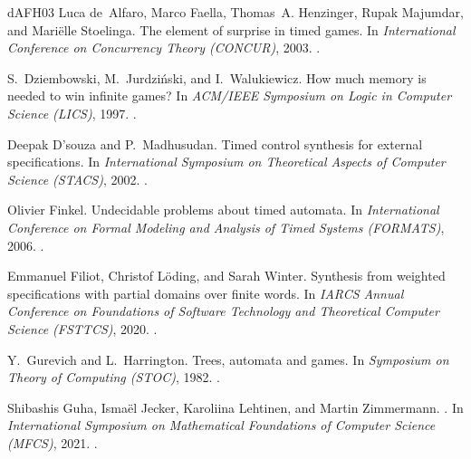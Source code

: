 \documentclass[10pt,a4paper]{amsart}
\theoremstyle{definition}
\numberwithin{equation}{section}
\begin{document}
\begin{thebibliography}{dAFH{\etalchar{+}}03}
Luca de~Alfaro, Marco Faella, Thomas~A. Henzinger, Rupak Majumdar, and
  Mari{\"{e}}lle Stoelinga.
\newblock The element of surprise in timed games.
\newblock In {\em International Conference on Concurrency Theory (CONCUR)},
  2003.
\newblock \href {https://doi.org/10.1007/978-3-540-45187-7_9}
  {}.

S.~Dziembowski, M.~Jurdzi{\'n}ski, and I.~Walukiewicz.
\newblock How much memory is needed to win infinite games?
\newblock In {\em ACM/IEEE Symposium on Logic in Computer Science (LICS)},
  1997.
\newblock \href {https://doi.org/10.1109/LICS.1997.614939}
  {}.

Deepak D'souza and P.~Madhusudan.
\newblock Timed control synthesis for external specifications.
\newblock In {\em International Symposium on Theoretical Aspects of Computer
  Science (STACS)}, 2002.
\newblock \href {https://doi.org/10.1007/3-540-45841-7_47}
  {}.

Olivier Finkel.
\newblock Undecidable problems about timed automata.
\newblock In {\em International Conference on Formal Modeling and Analysis of
  Timed Systems (FORMATS)}, 2006.
\newblock \href {https://doi.org/10.1007/11867340_14}
  {}.

Emmanuel Filiot, Christof L{\"o}ding, and Sarah Winter.
\newblock Synthesis from weighted specifications with partial domains over
  finite words.
\newblock In {\em IARCS Annual Conference on Foundations of Software Technology
  and Theoretical Computer Science (FSTTCS)}, 2020.
\newblock \href {https://doi.org/10.4230/LIPIcs.FSTTCS.2020.46}
  {}.

Y.~Gurevich and L.~Harrington.
\newblock Trees, automata and games.
\newblock In {\em Symposium on Theory of Computing (STOC)}, 1982.
\newblock \href {https://doi.org/10.1145/800070.802177}
  {}.

Shibashis Guha, Isma\"{e}l Jecker, Karoliina Lehtinen, and Martin Zimmermann.
.
\newblock In {\em International Symposium on Mathematical Foundations of
  Computer Science (MFCS)}, 2021.
\newblock \href {https://doi.org/10.4230/LIPIcs.MFCS.2021.53}
  {}.


\end{thebibliography}
\end{document}
